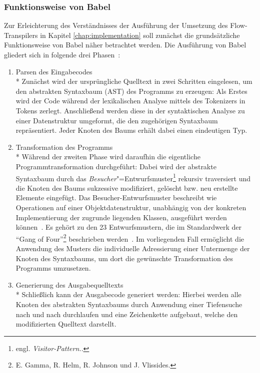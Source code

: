 \subsubsection{Funktionsweise von Babel}

Zur Erleichterung des Verständnisses der Ausführung der Umsetzung des Flow-Transpilers in Kapitel \ref{chap:implementation} soll zunächst die grundsätzliche Funktionsweise von Babel näher betrachtet werden. Die Ausführung von Babel gliedert sich in folgende drei Phasen~\autocite{BABEL:HANDBOOK}:

\begin{enumerate}
  \item {\libertineSB Parsen des Eingabecodes}\\*
    Zunächst wird der ursprüngliche Quelltext in zwei Schritten eingelesen, um den abstrakten Syntaxbaum (AST) des Programms zu erzeugen: Als Erstes wird der Code während der lexikalischen Analyse mittels des Tokenizers in Tokens zerlegt. Anschließend werden diese in der syntaktischen Analyse zu einer Datenstruktur umgeformt, die den zugehörigen Syntaxbaum repräsentiert. Jeder Knoten des Baums erhält dabei einen eindeutigen Typ.
    \\

  \item {\libertineSB Transformation des Programms}\\*
    Während der zweiten Phase wird daraufhin die eigentliche Programmtransformation durchgeführt: Dabei wird der abstrakte Syntaxbaum durch das \emph{Besucher}"=Entwurfsmuster\footnote{engl. \textit{Visitor-Pattern.}.} rekursiv traversiert und die Knoten des Baums sukzessive modifiziert, gelöscht bzw. neu erstellte Elemente eingefügt. Das Besucher-Entwurfsmuster beschreibt wie Operationen auf einer Objektdatenstruktur, unabhängig von der konkreten Implementierung der zugrunde liegenden Klassen, ausgeführt werden können~\autocite[634\psq]{Freeman:2004}. Es gehört zu den 23 Entwurfsmustern, die im Standardwerk  der \enquote{Gang of Four}\footnote{E. Gamma, R. Helm, R. Johnson und J. Vlissides.} beschrieben werden~\autocite[306\psqq]{GAMMA:1994}. Im vorliegenden Fall ermöglicht die Anwendung des Musters die individuelle Adressierung einer Untermenge der Knoten des Syntaxbaums, um dort die gewünschte Transformation des Programms umzusetzen.
    \\

  \item {\libertineSB Generierung des Ausgabequelltexts}\\*
    Schließlich kann der Ausgabecode generiert werden: Hierbei werden alle Knoten des abstrakten Syntaxbaums durch Anwendung einer Tiefensuche nach und nach durchlaufen und eine Zeichenkette aufgebaut, welche den modifizierten Quelltext darstellt.
\end{enumerate}

